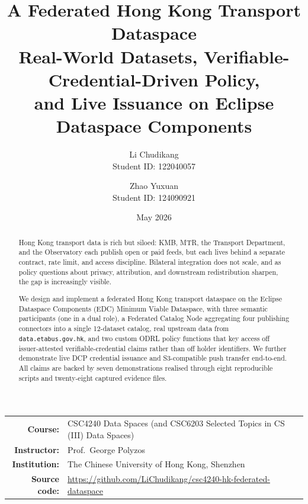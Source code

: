 \documentclass[11pt,a4paper]{article}
\title{%
  \vspace{-2em}%
  \textbf{A Federated Hong Kong Transport Dataspace}\\[0.4em]
  {\large Real-World Datasets, Verifiable-Credential-Driven Policy,\\
  and Live Issuance on Eclipse Dataspace Components}%
}
\author{%
  Li Chudikang\\[0.1em]
  Student ID: 122040057
  \and
  Zhao Yuxuan\\[0.1em]
  Student ID: 124090921
}
\date{May 2026}
\begin{document}
\maketitle

\begin{center}
\small
\begin{tabular}{rl}
\textbf{Course:}      & CSC4240 Data Spaces (and CSC6203 Selected Topics in CS (III) Data Spaces) \\
\textbf{Instructor:}  & Prof.\ George Polyzos \\
\textbf{Institution:} & The Chinese University of Hong Kong, Shenzhen \\
\textbf{Source code:} & \url{https://github.com/LiChudikang/csc4240-hk-federated-dataspace} \\
\end{tabular}
\end{center}

\vspace{0.5em}

\begin{abstract}
\noindent
Hong Kong transport data is rich but siloed: KMB, MTR, the Transport
Department, and the Observatory each publish open or paid feeds, but
each lives behind a separate contract, rate limit, and access discipline.
Bilateral integration does not scale, and as policy questions about
privacy, attribution, and downstream redistribution sharpen, the gap
is increasingly visible.

We design and implement a federated Hong Kong transport dataspace on
the Eclipse Dataspace Components (EDC) Minimum Viable Dataspace, with
three semantic participants (one in a dual role), a Federated Catalog
Node aggregating four publishing connectors into a single 12-dataset
catalog, real upstream data from \texttt{data.etabus.gov.hk}, and two
custom ODRL policy functions that key access off issuer-attested
verifiable-credential claims rather than off holder identifiers. We
further demonstrate live DCP credential issuance and S3-compatible
push transfer end-to-end. All claims are backed by seven demonstrations
realised through eight reproducible scripts and twenty-eight captured
evidence files.
\end{abstract}

\tableofcontents
\vspace{1em}

\end{document}
